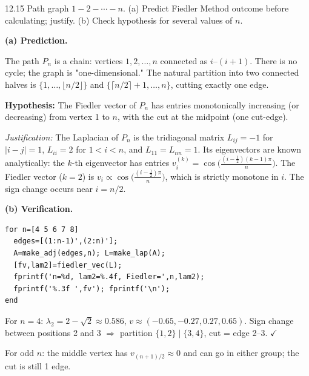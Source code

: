 \begin{exercise}{12.15}
Path graph $1-2-\cdots-n$. (a) Predict Fiedler Method outcome before calculating; justify. (b) Check hypothesis for several values of $n$.
\end{exercise}
\begin{solution}
\textbf{(a) Prediction.}

The path $P_n$ is a chain: vertices $1,2,\ldots,n$ connected as $i$--$(i+1)$. There is no cycle; the graph is "one-dimensional." The natural partition into two connected halves is $\{1,\ldots,\lfloor n/2\rfloor\}$ and $\{\lceil n/2\rceil+1,\ldots,n\}$, cutting exactly one edge.

\textbf{Hypothesis:} The Fiedler vector of $P_n$ has entries monotonically increasing (or decreasing) from vertex 1 to $n$, with the cut at the midpoint (one cut-edge).

\textit{Justification:} The Laplacian of $P_n$ is the tridiagonal matrix $L_{ij}=-1$ for $|i-j|=1$, $L_{ii}=2$ for $1<i<n$, and $L_{11}=L_{nn}=1$. Its eigenvectors are known analytically: the $k$-th eigenvector has entries $v_i^{(k)}=\cos\!\bigl(\frac{(i-\frac12)(k-1)\pi}{n}\bigr)$. The Fiedler vector ($k=2$) is $v_i\propto\cos\!\bigl(\frac{(i-\frac12)\pi}{n}\bigr)$, which is strictly monotone in $i$. The sign change occurs near $i=n/2$.

\textbf{(b) Verification.}
\begin{lstlisting}
for n=[4 5 6 7 8]
  edges=[(1:n-1)',(2:n)'];
  A=make_adj(edges,n); L=make_lap(A);
  [fv,lam2]=fiedler_vec(L);
  fprintf('n=%d, lam2=%.4f, Fiedler=',n,lam2);
  fprintf('%.3f ',fv'); fprintf('\n');
end
\end{lstlisting}
For $n=4$: $\lambda_2=2-\sqrt{2}\approx0.586$, $v\approx(-0.65,-0.27,0.27,0.65)$. Sign change between positions 2 and 3 $\Rightarrow$ partition $\{1,2\}\mid\{3,4\}$, cut = edge 2--3. $\checkmark$

For odd $n$: the middle vertex has $v_{(n+1)/2}\approx0$ and can go in either group; the cut is still 1 edge.
\end{solution}

